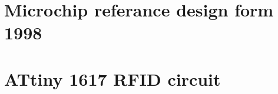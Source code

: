 %
%


%
%
\setcounter{chapter}{0}
\renewcommand{\thechapter}{\Alph{chapter}}
\chapter{Microchip referance design form 1998}
\label{appendix:ASKreader}

\chapter{ATtiny 1617 RFID circuit}
\label{appendix:RFIDreader}
\begin{landscape}

\end{landscape}

